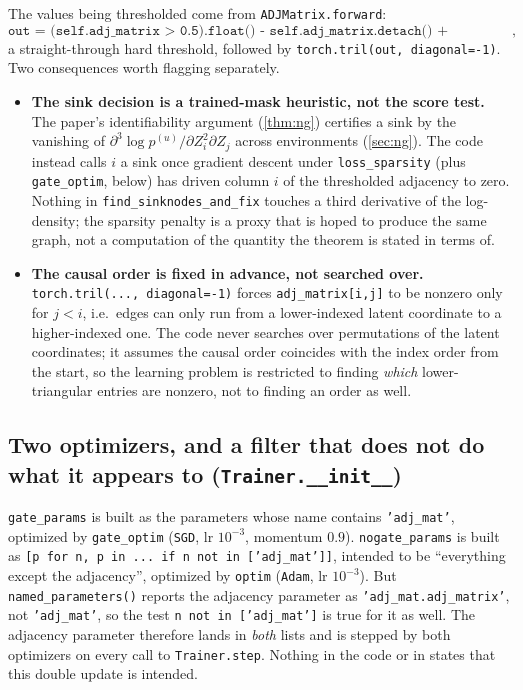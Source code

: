 The values being thresholded come from \texttt{ADJMatrix.forward}:
$$
\texttt{out = (self.adj\_matrix > 0.5).float() - self.adj\_matrix.detach() + self.adj\_matrix},
$$
a straight-through hard threshold, followed by \texttt{torch.tril(out, diagonal=-1)}. 
Two consequences worth flagging separately.
\begin{itemize}[leftmargin=1.5em]
\item \textbf{The sink decision is a trained-mask heuristic, not the score test.} The paper's identifiability
      argument (\cref{thm:ng}) certifies a sink by the vanishing of
      $\partial^3\log p^{(u)}/\partial Z_i^2\partial Z_j$ across environments (\cref{sec:ng}). The code instead
      calls $i$ a sink once gradient descent under \texttt{loss\_sparsity} (plus \texttt{gate\_optim}, below) has
      driven column $i$ of the thresholded adjacency to zero. Nothing in \texttt{find\_sinknodes\_and\_fix}
      touches a third derivative of the log-density; the sparsity penalty is a proxy that is hoped to produce
      the same graph, not a computation of the quantity the theorem is stated in terms of.
\item \textbf{The causal order is fixed in advance, not searched over.} \texttt{torch.tril(..., diagonal=-1)}
      forces \texttt{adj\_matrix[i,j]} to be nonzero only for $j<i$, i.e.\ edges can only run from a
      lower-indexed latent coordinate to a higher-indexed one. The code never searches over permutations of the
      latent coordinates; it assumes the causal order coincides with the index order from the start, so the
      learning problem is restricted to finding \emph{which} lower-triangular entries are nonzero, not to
      finding an order as well.
\end{itemize}

\subsection{Two optimizers, and a filter that does not do what it appears to \texorpdfstring{\newline}{ } (\texttt{Trainer.\_\_init\_\_})}

\texttt{gate\_params} is built as the parameters whose name contains \texttt{'adj\_mat'}, optimized by
\texttt{gate\_optim} (\texttt{SGD}, lr $10^{-3}$, momentum $0.9$). \texttt{nogate\_params} is built as
\texttt{[p for n, p in ... if n not in ['adj\_mat']]}, intended to be ``everything except the adjacency'',
optimized by \texttt{optim} (\texttt{Adam}, lr $10^{-3}$). But \texttt{named\_parameters()} reports the
adjacency parameter as \texttt{'adj\_mat.adj\_matrix'}, not \texttt{'adj\_mat'}, so the test
\texttt{n not in ['adj\_mat']} is true for it as well. The adjacency parameter therefore lands in
\emph{both} lists and is stepped by both optimizers on every call to \texttt{Trainer.step}. Nothing in the
code or in \cite{ng2025} states that this double update is intended.


